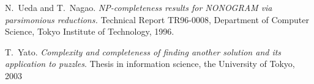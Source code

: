 \documentclass[12pt]{article}
\begin{document}
\begin{thebibliography}{99}
N.~Ueda and T.~Nagao. \emph{NP-completeness results for NONOGRAM via
parsimonious reductions.} Technical Report TR96-0008, Department of
Computer Science, Tokyo Institute of Technology, 1996.

T.~Yato. \emph{Complexity and completeness of finding another solution
and its application to puzzles}.  Thesis in information science, the
University of Tokyo, 2003
\end{thebibliography}

\end{document}

